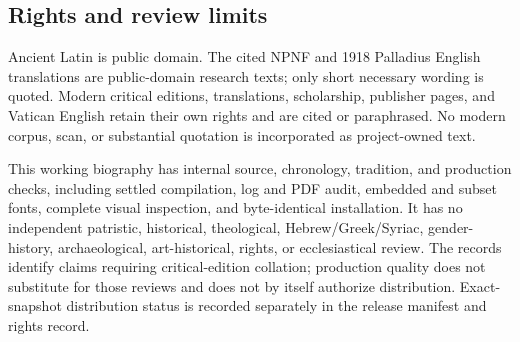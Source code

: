 \subsection{Rights and review limits}

Ancient Latin is public domain. The cited NPNF and 1918 Palladius English
translations are public-domain research texts; only short necessary wording is
quoted. Modern critical editions, translations, scholarship, publisher pages,
and Vatican English retain their own rights and are cited or paraphrased. No
modern corpus, scan, or substantial quotation is incorporated as project-owned
text.

This working biography has internal source, chronology, tradition, and
production checks, including settled compilation, log and PDF audit, embedded
and subset fonts, complete visual inspection, and byte-identical installation.
It has no independent patristic, historical, theological,
Hebrew/Greek/Syriac, gender-history, archaeological, art-historical, rights,
or ecclesiastical review. The records identify claims requiring
critical-edition collation; production quality does not substitute for those
reviews and does not by itself authorize distribution. Exact-snapshot
distribution status is recorded separately in the release manifest and rights
record.

\endgroup
